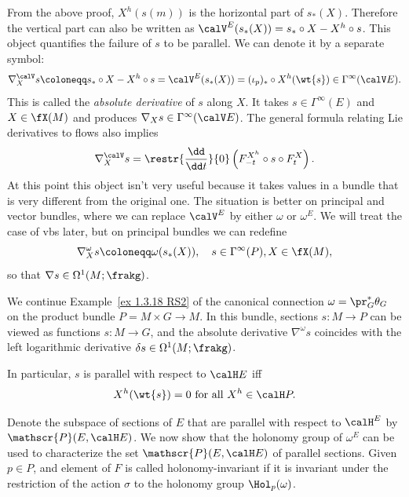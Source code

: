 \begin{rem}\label{rem absolute derivative}
    From the above proof, $X^h(s(m))$ is the horizontal part of $s_\ast(X)$. Therefore the vertical part can also be written as $\calV^E(s_\ast(X))=s_\ast\circ X-X^h\circ s$. This object quantifies the failure of $s$ to be parallel. We can denote it by a separate symbol:
    \[\nabla_X^{\calV} s\coloneqq s_\ast\circ X-X^h\circ s=\calV^E(s_\ast(X))=(\iota_p)_\ast\circ X^h(\wt{s})\in\Gamma^\infty(\calV E).\]
    This is called the \emph{absolute derivative} of $s$ along $X$. It takes $s\in\Gamma^\infty(E)$ and $X\in\fX(M)$ and produces $\nabla_X s\in \Gamma^\infty(\calV E)$. The general formula relating Lie derivatives to flows also implies
    \[\nabla_X^{\calV} s=\restr{\frac{\dd}{\dd t}}{0}\left(F^{X^h}_{-t}\circ s\circ F^X_t\right).\]
    At this point this object isn't very useful because it takes values in a bundle that is very different from the original one. The situation is better on principal and vector bundles, where we can replace $\calV^E$ by either $\omega$ or $\omega^E$. We will treat the case of \glspl{vb} later, but on principal bundles we can redefine
    \[\nabla_X^\omega s\coloneqq \omega(s_\ast(X)), \quad s\in\Gamma^\infty(P),X\in\fX(M),\]
    so that $\nabla s\in\Omega^1(M;\frakg)$.
\end{rem}


\begin{example}
    We continue Example~\ref{ex 1.3.18 RS2} of the canonical connection $\omega=\pr_G^\ast\theta_G$ on the product bundle $P=M\times G\to M$. In this bundle, sections $s:M\to P$ can be viewed as functions $s:M\to G$, and the absolute derivative $\nabla^\omega s$ coincides with the left logarithmic derivative $\delta s\in\Omega^1(M;\frakg)$.
\end{example}



\begin{cor}\label{cor 1.5.7 RS2 my version}
    In particular, $s$ is parallel with respect to $\calH E$ iff
    \[X^h(\wt{s})=0\text{ for all }X^h\in\calH P.\]
\end{cor}


Denote the subspace of sections of $E$ that are parallel with respect to $\calH^E$ by $\mathscr{P}(E,\calH E)$.  We now show that the holonomy group of $\omega^E$ can be used to characterize the set $\mathscr{P}(E,\calH E)$ of parallel sections. Given $p\in P$, and element of $F$ is called holonomy-invariant if it is invariant under the restriction of the action $\sigma$ to the holonomy group $\Hol_p(\omega)$.

